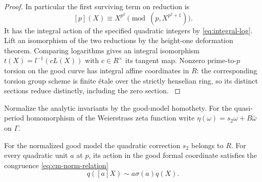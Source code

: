 \begin{proof}
In particular the first surviving term on reduction is
\[
  [p](X)\equiv X^{p^2}\pmod{(p,X^{p^2+1})}.
\]
It has the integral action of the specified quadratic integers
by \eqref{eq:integral-log}. Lift an isomorphism of the two
reductions by the height-one deformation theorem. Comparing
logarithms gives an integral isomorphism \(t(X)=l^{-1}(cL(X))\)
with \(c\in R^\times\) its tangent map. Nonzero prime-to-\(p\)
torsion on the good curve has integral affine coordinates in
\(R\): the corresponding torsion group scheme is finite
\'etale over the strictly henselian ring, so its distinct
sections reduce distinctly, including the zero section.
\cite{drinfeld-formal,serre-tate}

\end{proof}

Normalize the analytic invariants by the good-model homothety.
For the quasi-period homomorphism of the Weierstrass zeta
function write \(\eta(\omega)=s_2\omega+B\bar\omega\) on
\(\Gamma\).

\begin{proposition}\label{prop:good-cm-norm}
For the normalized good model the quadratic correction \(s_2\)
belongs to \(R\). For every quadratic unit \(a\) at \(p\), its action in the good formal coordinate satisfies the congruence \eqref{eq:cm-norm-relation}
\[
 q([a]X)\sim a\sigma(a)q(X).
\]

\end{proposition}

